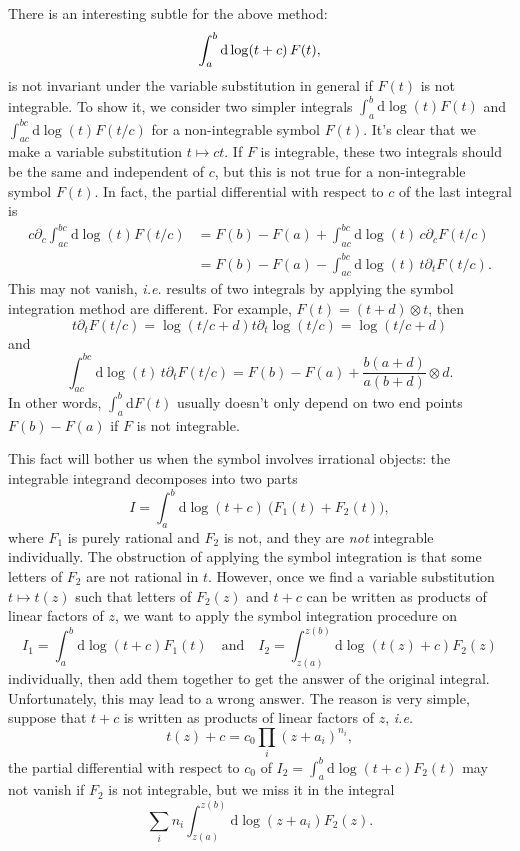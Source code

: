 \documentclass[a4paper,12pt]{article}
\newcommand{\dif}{\mathrm{d}} %
\begin{document}
There is an interesting subtle for the above method:
\[
\int_a^b {\rm d}\log(t+c)\, F(t),
\]
is not invariant under the variable substitution in general if $F(t)$ is not integrable. To show it, we consider two simpler integrals $\int_a^b \dif\log(t) F(t)$ and $\int_{ac}^{bc} \dif\log(t) F(t/c)$ for a non-integrable symbol $F(t)$. It's clear that we make a variable substitution $t\mapsto ct$. If $F$ is integrable, these two integrals should be the same and independent of $c$, but this is not true for a non-integrable symbol $F(t)$. In fact, the partial differential with respect to $c$ of the last integral is 
\begin{align*}
    c\partial_c\int_{ac}^{bc} \dif\log(t) F(t/c) & = F(b)-F(a)+\int_{ac}^{bc}\dif\log(t) \, c\partial_cF(t/c)\\
    &= F(b)-F(a)-\int_{ac}^{bc} \dif\log(t)\,  t\partial_tF(t/c).
\end{align*}
This may not vanish, \textit{i.e.} results of two integrals by applying the symbol integration method are different. For example, $F(t)=(t+d)\otimes t$, then
\[
    t\partial_tF(t/c)=\log(t/c+d) t\partial_t\log(t/c)=\log(t/c+d)
\]
and 
\[
    \int_{ac}^{bc} \dif\log(t)\,  t\partial_tF(t/c)=F(b)-F(a)+\frac{b (a+d)}{a (b+d)}\otimes d.
\]
In other words, $\int_a^b \dif F(t)$ usually doesn't only depend on two end points $F(b)-F(a)$ if $F$ is not integrable. 

This fact will bother us when the symbol involves irrational objects: the integrable integrand decomposes into two parts
\begin{equation}
    I=\int_a^b \dif\log (t+c) \: \bigl(F_1(t)+F_2(t)\bigr),
\end{equation}
where $F_1$ is purely rational and $F_2$ is not, and they are \emph{not} integrable individually. The obstruction of applying the symbol integration is that some letters of $F_2$ are not rational in $t$. However, once we find a variable substitution $t\mapsto t(z)$ such that letters of $F_2(z)$ and $t+c$ can be written as products of linear factors of $z$, we want to apply the symbol integration procedure on 
\[
    I_1=\int_a^b \dif\log (t+c) F_1(t)\quad \text{and}\quad I_2=\int_{z(a)}^{z(b)} \dif\log (t(z)+c) F_2(z)
\]
individually, then add them together to get the answer of the original integral. Unfortunately, this may lead to a wrong answer. The reason is very simple, suppose that $t+c$ is written as products of linear factors of $z$, \textit{i.e.}
\[
    t(z)+c=c_0\prod_i (z+a_i)^{n_i},
\]
the partial differential with respect to $c_0$ of $I_2=\int_a^b \dif \log(t+c)F_2(t)$
may not vanish if $F_2$ is not integrable, but we miss it in the integral 
\[
    \sum_{i} n_i\int_{z(a)}^{z(b)} \dif\log (z+a_i) F_2(z).
\]
\end{document}
